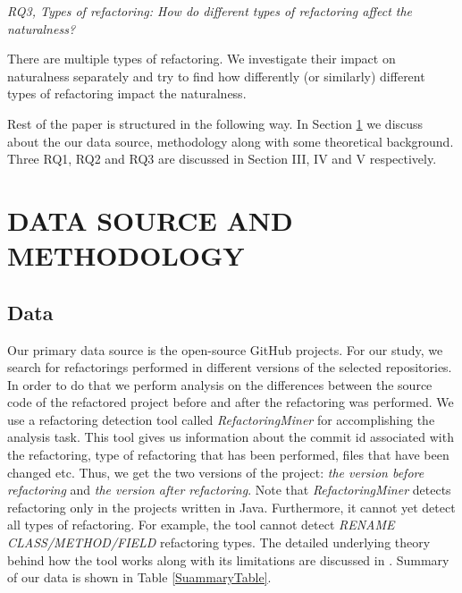 \documentclass[conference]{IEEEtran}
\begin{document}
\textit{RQ3, Types of refactoring: How do different types of refactoring affect the naturalness?}

There are multiple types of refactoring. We investigate their impact on naturalness separately and try to find how differently (or similarly) different types of refactoring impact the naturalness.

Rest of the paper is structured in the following way. In Section \ref{Methodology} we discuss about the our data source, methodology along with some theoretical background. Three RQ1, RQ2 and RQ3 are discussed in Section III, IV and V respectively. 

 
\section{DATA SOURCE AND METHODOLOGY} \label{Methodology}
\subsection{Data}
Our primary data source is the open-source GitHub projects. For our study, we search for refactorings performed in different versions of the selected repositories. In order to do that we perform analysis on the differences between the source code of the refactored project before and after the refactoring was performed. We use a refactoring detection tool called \textit{RefactoringMiner} \cite{Silva} for accomplishing the analysis task. This tool gives us information about the commit id associated with the refactoring, type of refactoring that has been performed, files that have been changed etc. Thus, we get the two versions of the project: \textit{the version before refactoring} and \textit{the version after refactoring}. Note that \textit{RefactoringMiner} detects refactoring only in the projects written in Java. Furthermore, it cannot yet detect all types of refactoring. For example, the tool cannot detect \textit{RENAME CLASS/METHOD/FIELD} refactoring types. The detailed underlying theory behind how the tool works along with its limitations are discussed in \cite{NikolaosTsantalis}. Summary of our data is shown in Table \ref{SuammaryTable}.
\end{document}
